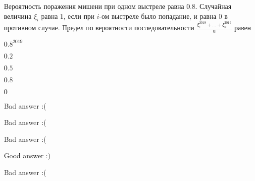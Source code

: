 
\begin{question}
Вероятность поражения мишени при одном выстреле равна \(0.8\). Случайная
величина \(\xi_i\) равна \(1\), если при \(i\)-ом выстреле было
попадание, и равна \(0\) в противном случае. Предел по вероятности
последовательности \(\frac{\xi_1^{2019} + \ldots + \xi_n^{2019}}{n}\)
равен
\begin{answerlist}
  \item \(0.8^{2019}\)
  \item \(0.2\)
  \item \(0.5\)
  \item \(0.8\)
  \item \(0\)
\end{answerlist}
\end{question}

\begin{solution}
\begin{answerlist}
  \item Bad answer :(
  \item Bad answer :(
  \item Bad answer :(
  \item Good answer :)
  \item Bad answer :(
\end{answerlist}
\end{solution}

